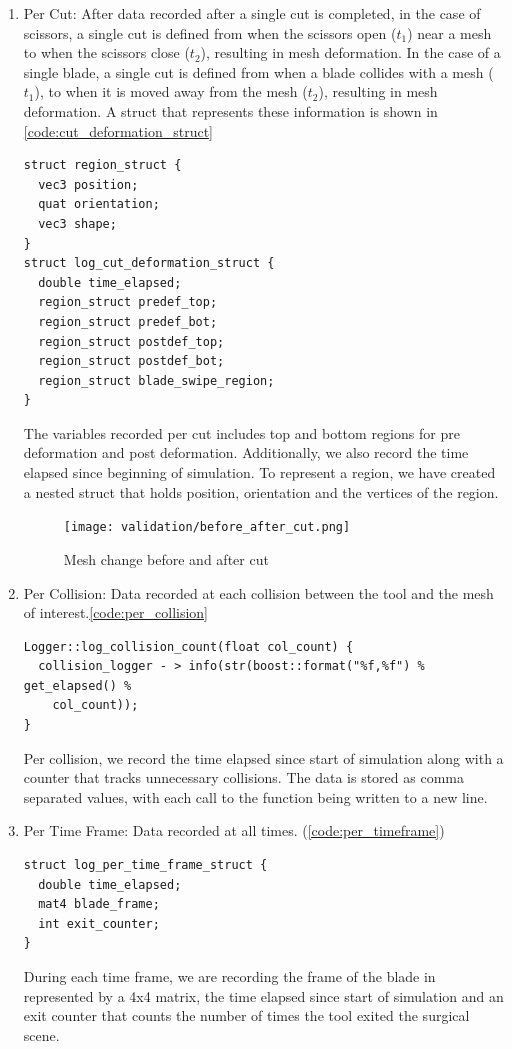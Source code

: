 \begin{enumerate}
    \item Per Cut: After data recorded after a single cut is completed, in the case of scissors, a single cut is defined from when the scissors open ($t_1$) near a mesh to when the scissors close ($t_2$), resulting in mesh deformation. In the case of a single blade, a single cut is defined from when a blade collides with a mesh ($t_1$), to when it is moved away from the mesh ($t_2$), resulting in mesh deformation. A struct that represents these information is shown in \autoref{code:cut_deformation_struct}
    \begin{lstlisting}[style=CStyle, caption={Cut deformation struct}, label={code:cut_deformation_struct}]
struct region_struct {
  vec3 position;
  quat orientation;
  vec3 shape;
}
struct log_cut_deformation_struct {
  double time_elapsed;
  region_struct predef_top;
  region_struct predef_bot;
  region_struct postdef_top;
  region_struct postdef_bot;
  region_struct blade_swipe_region;
}
    \end{lstlisting}
    The variables recorded per cut includes top and bottom regions for pre deformation and post deformation. Additionally, we also record the time elapsed since beginning of simulation. To represent a region, we have created a nested struct that holds position, orientation and the vertices of the region.
    \begin{figure}
      \centering%
      \texttt{[image: validation/before\_after\_cut.png]}
      \caption{Mesh change before and after cut}\label{fig:before_after_cut}
    \end{figure}

    \item Per Collision: Data recorded at each collision between the tool and the mesh of interest.\autoref{code:per_collision}
    \begin{lstlisting}[style=CStyle, caption={Log per collision}, label={code:per_collision}]
Logger::log_collision_count(float col_count) {
  collision_logger - > info(str(boost::format("%f,%f") % get_elapsed() %
    col_count));
}
    \end{lstlisting}
   Per collision, we record the time elapsed since start of simulation along with a counter that tracks unnecessary collisions. The data is stored as comma separated values, with each call to the function being written to a new line.

    \item Per Time Frame: Data recorded at all times. (\autoref{code:per_timeframe})
    \begin{lstlisting}[style=CStyle, caption={Struct for logging per time frame}, label={code:per_timeframe}]
struct log_per_time_frame_struct {
  double time_elapsed;
  mat4 blade_frame;
  int exit_counter;
}
    \end{lstlisting}
    During each time frame, we are recording the frame of the blade in represented by a 4x4 matrix, the time elapsed since start of simulation and an exit counter that counts the number of times the tool exited the surgical scene.

\end{enumerate}

